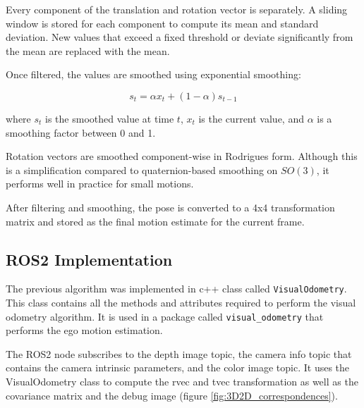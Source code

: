 Every component of the translation and rotation vector is  separately. A sliding window is stored for each component to compute its mean and
standard deviation. New values that exceed a fixed threshold or deviate significantly from the mean 
are replaced with the mean.

Once filtered, the values are smoothed using exponential smoothing:

\begin{equation}
s_t = \alpha x_t + (1 - \alpha) s_{t-1}
\end{equation}

where $s_t$ is the smoothed value at time $t$, $x_t$ is the current value, and $\alpha$ is a smoothing
factor between 0 and 1.

Rotation vectors are smoothed component-wise in Rodrigues form. Although this is a simplification
compared to quaternion-based smoothing on $SO(3)$, it performs well in practice for small motions.

After filtering and smoothing, the pose is converted to a 4x4 transformation matrix and stored as the
final motion estimate for the current frame. 


\subsection{ROS2 Implementation}
\label{sec:ImplementationVisualOdometry}

The previous algorithm was implemented in c++ class called \texttt{VisualOdometry}. This class 
contains all the methods and attributes required to perform the visual odometry algorithm. It
is used in a package called \texttt{visual\_odometry} that performs the ego motion estimation.

The ROS2 node subscribes to the depth image topic, the camera info topic that contains the camera
intrinsic parameters, and the color image topic. It uses the VisualOdometry class to compute the rvec and tvec transformation as 
well as the covariance matrix and the debug image (figure \ref{fig:3D2D_correspondences}).

